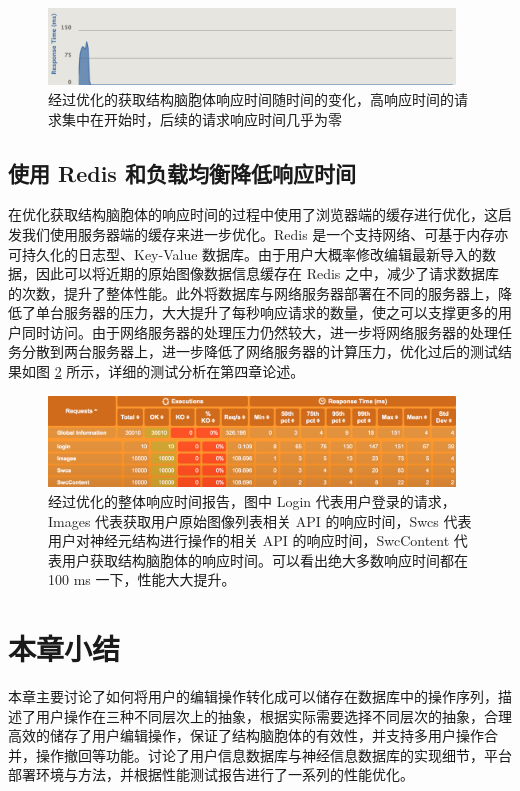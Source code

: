 \begin{figure}
\centering
\includegraphics[width=108mm]{images/res-time}
\caption{经过优化的获取结构脑胞体响应时间随时间的变化，高响应时间的请求集中在开始时，后续的请求响应时间几乎为零}
\label{res-time}
\end{figure}

\subsection{使用 Redis 和负载均衡降低响应时间}
在优化获取结构脑胞体的响应时间的过程中使用了浏览器端的缓存进行优化，这启发我们使用服务器端的缓存来进一步优化。Redis 是一个支持网络、可基于内存亦可持久化的日志型、Key-Value 数据库。由于用户大概率修改编辑最新导入的数据，因此可以将近期的原始图像数据信息缓存在 Redis 之中，减少了请求数据库的次数，提升了整体性能。此外将数据库与网络服务器部署在不同的服务器上，降低了单台服务器的压力，大大提升了每秒响应请求的数量，使之可以支撑更多的用户同时访问。由于网络服务器的处理压力仍然较大，进一步将网络服务器的处理任务分散到两台服务器上，进一步降低了网络服务器的计算压力，优化过后的测试结果如图 \ref{opt} 所示，详细的测试分析在第四章论述。

\begin{figure}
\centering
\includegraphics[width=108mm]{images/opt}
\caption{经过优化的整体响应时间报告，图中 Login 代表用户登录的请求， Images 代表获取用户原始图像列表相关 API 的响应时间，Swcs 代表用户对神经元结构进行操作的相关 API 的响应时间，SwcContent 代表用户获取结构脑胞体的响应时间。可以看出绝大多数响应时间都在 100 ms 一下，性能大大提升。}
\label{opt}
\end{figure}

\section{本章小结}
本章主要讨论了如何将用户的编辑操作转化成可以储存在数据库中的操作序列，描述了用户操作在三种不同层次上的抽象，根据实际需要选择不同层次的抽象，合理高效的储存了用户编辑操作，保证了结构脑胞体的有效性，并支持多用户操作合并，操作撤回等功能。讨论了用户信息数据库与神经信息数据库的实现细节，平台部署环境与方法，并根据性能测试报告进行了一系列的性能优化。
